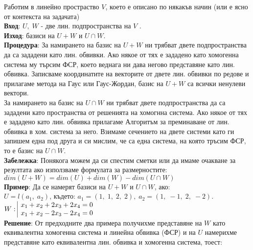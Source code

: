\documentclass[12pt]{article}
\begin{document}
Работим в линейно простраство $V$, което е описано по някакъв начин
(или е ясно от контекста на задачата) \\

\textbf{Вход}: $U, \; W$ - две лин. подпространства на $V$ . \\

\textbf{Изход}: базиси на $U + W$ и $U \cap W$. \\

\textbf{Процедура}: За намирането на базис на $U + W$ ни трябват двете подпространства
да са зададени като лин. обвивки. Ако някое от тях е зададено като хомогенна система
му търсим ФСР, което веднага ни дава негово представяне като лин. обвивка.
Записваме координатите на векторите от двете лин. обвивки по редове и прилагаме
метода на Гаус или Гаус-Жордан, базис на $U + W$ са всички ненулеви вектори. \\

За намирането на базис на $U \cap W$ ни трябват двете подпространства
да са зададени като пространства от решенията на хомогнна система.
Ако някое от тях е зададено като лин. обвивка прилагаме
Алгоритъм за преминаване от лин. обвивка в хом. система за него.
Взимаме сечението на двете системи като ги запишем една под друга и си мислим, че са една система,
на която тръсим ФСР, то е базис на $U \cap W$. \\

\textbf{Забележка}: Понякога можем да си спестим сметки или да имаме очакване за резултата ако използваме
формулата за размерностите: \\

$dim(U + W) = dim(U) + dim(W) - dim(U \cap W)$ \\

\textbf{Пример}: Да се намерят базиси на $U + W$ и $U \cap W$, ако: \\

$U = l(a_1, \; a_2)$, където: $a_1 = (1, \; 1, \; 2, \; 2), \; a_2 = (1, \; -1, \; 2, \; -2)$. \\

$W : \begin{array}{|l@{}}
    x_1 + x_2 + 2x_3 + 2x_4 = 0 \\
    x_1 + x_2 - 2x_3 - 2x_4 = 0
\end{array}$ \\

\textbf{Решение}: От предходните два примера получихме представяне на $W$
като еквивалентна хомогенна система и линейна обвивка (ФСР) и на $U$
намерихме представяне като еквивалентна лин. обвивка и хомогенна система, тоест: \\
\end{document}
